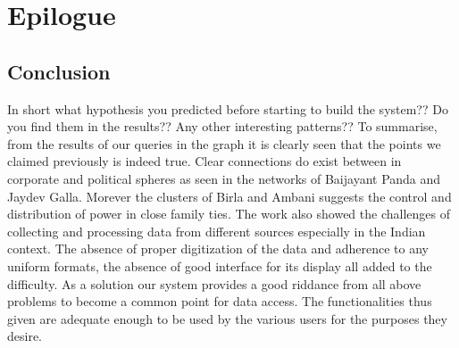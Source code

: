 \chapter{Epilogue}
\section{Conclusion}
 In short what hypothesis you predicted before starting to build the system?? Do you find them in the results?? Any other interesting patterns?? 
To summarise, from the results of our queries in the graph it is clearly seen that the points we claimed previously is indeed true. Clear connections do exist between in corporate and political spheres as seen in the networks of Baijayant Panda and Jaydev Galla. Morever the clusters of Birla and Ambani suggests the control and distribution of power in close family ties.  
The work also showed the challenges of collecting and processing data from different sources especially in the Indian context. The absence of proper digitization of the data and adherence to any uniform formats, the absence of good interface for its display all added to the difficulty.
As a solution our system provides a good riddance from all above problems to become a common point for data access. The functionalities thus given are adequate enough to be used by the various users for the purposes they desire.

